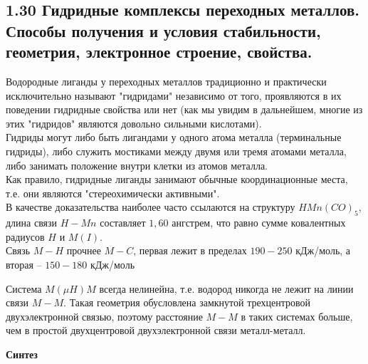 


\subsection{1.30 Гидридные комплексы переходных металлов. Способы получения и условия стабильности, геометрия, электронное строение, свойства.}
Водородные лиганды у переходных металлов традиционно и практически исключительно называют "гидридами" независимо от того, проявляются в их поведении гидридные свойства или нет (как мы увидим в дальнейшем, многие из этих "гидридов" являются довольно сильными кислотами). \\
Гидриды могут либо быть лигандами у одного атома металла (терминальные гидриды), либо служить мостиками между двумя или тремя атомами металла, либо занимать положение внутри клетки из атомов металла.  \\
Как правило, гидридные лиганды занимают обычные координационные места, т.е. они являются "стереохимически активными". \\
В качестве доказательства наиболее часто ссылаются на структуру $HMn(CO)_5$, длина связи $H-Mn$ составляет $1,60$ ангстрем, что равно сумме ковалентных радиусов $H$ и $M(I)$. \\
Связь $M-H$ прочнее $M-C$, первая лежит в пределах $190-250$ кДж/моль, а вторая -- $150-180 $ кДж/моль  	
\begin{figure} [H]
	\centering {\texttt{[image: oo2]}}
\end{figure}
Система $M(\mu H)M$ всегда нелинейна, т.е. водород никогда не лежит на линии связи $M - M$. Такая геометрия обусловлена замкнутой трехцентровой двухэлектронной связью, поэтому расстояние $M - M$ в таких системах больше, чем в простой двухцентровой двухэлектронной связи металл-металл.
\begin{figure} [H]
	\centering {\texttt{[image: oo3]}}
\end{figure}
\textbf{Синтез}
